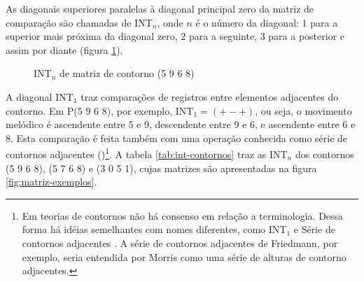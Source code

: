 As diagonais superiores paralelas à diagonal principal zero da matriz
de comparação são chamadas de INT$_n$, onde $n$ é o número da
diagonal: 1 para a superior mais próxima da diagonal zero, 2 para a
seguinte, 3 para a posterior e assim por diante (figura
\ref{fig:int-exemplos}).

\begin{figure}
  \centering
  \qquad
  \qquad
  \caption{INT$_n$ de matriz de contorno (5 9 6 8)}
  \label{fig:int-exemplos}
\end{figure}

A diagonal INT$_1$ traz comparações de registros entre elementos
adjacentes do contorno. Em P(5 9 6 8), por exemplo, INT$_1=(+ - +)$,
ou seja, o movimento melódico é ascendente entre 5 e 9, descendente
entre 9 e 6, e ascendente entre 6 e 8. Esta comparação é feita também
com uma operação conhecida como série de contornos adjacentes
()\footnote{Em teorias de contornos não há consenso em relação
  a terminologia. Dessa forma há idéias semelhantes com nomes
  diferentes, como INT$_1$ e Série de contornos adjacentes
  \cite{friedmann87:response}. A série de contornos adjacentes de
  Friedmann, por exemplo, seria entendida por Morris como uma série de
  alturas de contorno adjacentes.}. A tabela \ref{tab:int-contornos}
traz as INT$_n$ dos contornos (5 9 6 8), (5 7 6 8) e (3 0 5 1), cujas
matrizes são apresentadas na figura \ref{fig:matriz-exemplos}.

